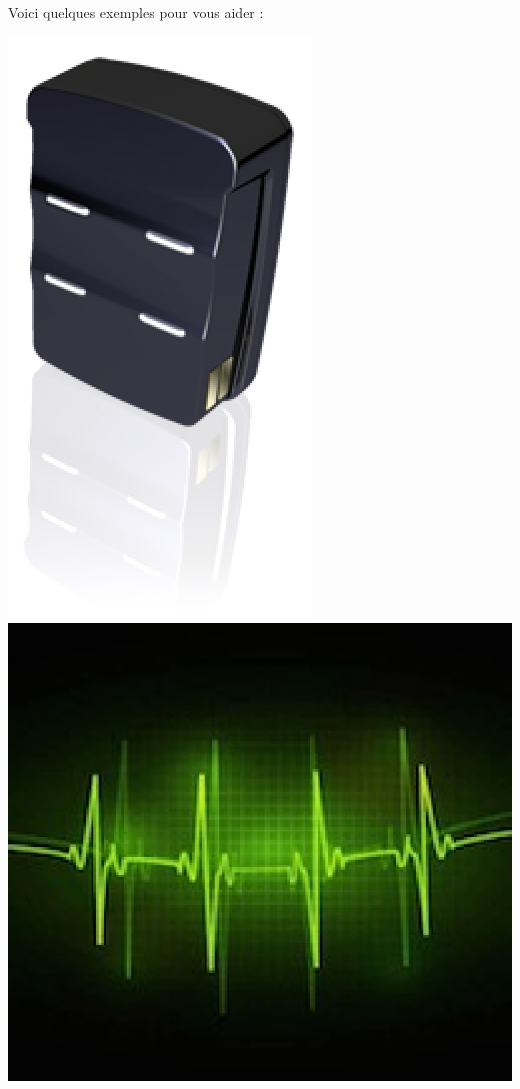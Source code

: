 \documentclass[a4paper,11pt]{beamer}
\begin{document}
\begin{frame}
\centering
Voici quelques exemples pour vous aider :
\vspace{1cm}

\includegraphics[scale=.5]{images/EMG.eps}\hspace*{2cm}
\includegraphics[scale=.25]{images/ECG.eps}\hspace*{2cm}

\end{frame}
\end{document}
